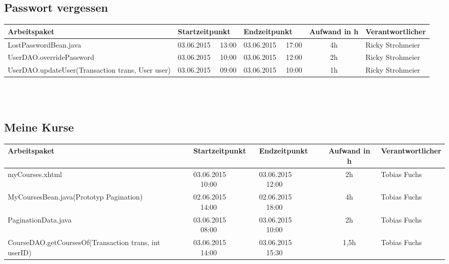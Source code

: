 \begin{landscape}
\subsection{Passwort vergessen}
\begin{tabular}{|p{10.3cm}|p{3.2cm}|p{3.2cm}|c|p{3.5cm}|}
	\hline  \textbf{Arbeitspaket} & \textbf{Startzeitpunkt} & \textbf{Endzeitpunkt} & \textbf{Aufwand in h} & \textbf{Verantwortlicher} \\ 
	\hline   LostPasswordBean.java                                & 03.06.2015 \ \ 13:00     & 03.06.2015 \ \ 17:00     &      4h             & Ricky Strohmeier\\ 
	\hline   UserDAO.overridePassword                                  & 03.06.2015 \ \ 10:00     & 03.06.2015 \ \ 12:00     &      2h             & Ricky Strohmeier\\ 
	\hline   UserDAO.updateUser(Transaction trans, User user)     & 03.06.2015 \ \ 09:00     & 03.06.2015 \ \ 10:00     &      1h             & Ricky Strohmeier\\ 
	\hline 
\end{tabular} \ \\
\ \\

\subsection{Meine Kurse}
\begin{tabular}{|p{10.3cm}|p{3.2cm}|p{3.2cm}|c|p{3.5cm}|}
	\hline  \textbf{Arbeitspaket} & \textbf{Startzeitpunkt} & \textbf{Endzeitpunkt} & \textbf{Aufwand in h} & \textbf{Verantwortlicher} \\ 
	\hline   myCourses.xhtml                                       & 03.06.2015 \ \ 10:00       & 03.06.2015  \ \  12:00      &  2h              & Tobias Fuchs\\
	\hline   MyCoursesBean.java(Prototyp Pagination)               & 02.06.2015 \ \ 14:00       & 02.06.2015  \ \  18:00      &  4h              & Tobias Fuchs\\
	\hline   PaginationData.java                                   & 03.06.2015 \ \ 08:00       & 03.06.2015  \ \  10:00      &  2h              & Tobias Fuchs\\
	\hline   CourseDAO.getCoursesOf(Transaction trans, int userID) & 03.06.2015 \ \ 14:00       & 03.06.2015  \ \  15:30      &  1,5h            & Tobias Fuchs\\
	\hline 
\end{tabular} \ \\
\ \\


\end{landscape}
